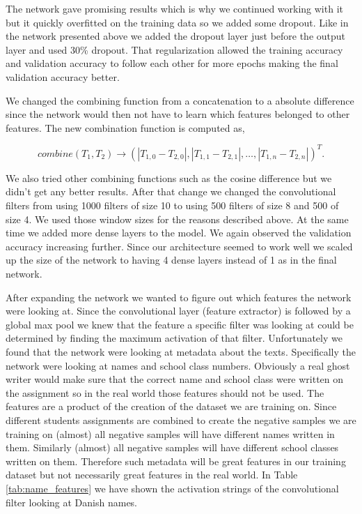 The network gave promising results which is why we continued working with it but
it quickly overfitted on the training data so we added some dropout. Like in
the network presented above we added the dropout layer just before the output
layer and used 30\% dropout. That regularization allowed the training accuracy
and validation accuracy to follow each other for more epochs making the final
validation accuracy better.

We changed the combining function from a concatenation to a absolute difference
since the network would then not have to learn which features belonged to other
features. The new combination function is computed as,

\begin{equation}
    combine(T_1, T_2) \rightarrow \left(
        |T_{1,0} - T_{2,0}|, |T_{1,1} - T_{2,1}|, \dots, |T_{1,n} - T_{2,n}|
    \right)^T.
\end{equation}

We also tried other combining functions such as the cosine difference but we
didn't get any better results. After that change we changed the convolutional
filters from using 1000 filters of size 10 to using 500 filters of size 8 and
500 of size 4. We used those window sizes for the reasons described above. At
the same time we added more dense layers to the model. We again observed the
validation accuracy increasing further. Since our architecture seemed to work
well we scaled up the size of the network to having 4 dense layers instead of
1 as in the final network.

After expanding the network we wanted to figure out which features the network
were looking at. Since the convolutional layer (feature extractor) is followed
by a global max pool we knew that the feature a specific filter was looking at
could be determined by finding the maximum activation of that filter.
Unfortunately we found that the network were looking at metadata about the
texts. Specifically the network were looking at names and school class numbers.
Obviously a real ghost writer would make sure that the correct name and school
class were written on the assignment so in the real world those features should
not be used. The features are a product of the creation of the dataset we are
training on. Since different students assignments are combined to create the
negative samples we are training on (almost) all negative samples will have
different names written in them. Similarly (almost) all negative samples will
have different school classes written on them. Therefore such metadata will be
great features in our training dataset but not necessarily great features in the
real world. In Table \ref{tab:name_features} we have shown the activation
strings of the convolutional filter looking at Danish names.

